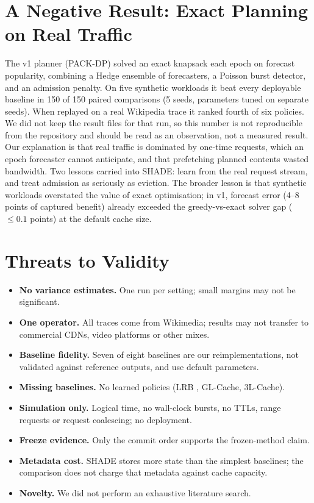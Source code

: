 \documentclass[conference]{IEEEtran}
\begin{document}
\section{A Negative Result: Exact Planning on Real Traffic}\label{sec:v1}
The v1 planner (PACK-DP) solved an exact knapsack each epoch on forecast popularity, combining a Hedge ensemble of
forecasters, a Poisson burst detector, and an admission penalty. On five synthetic workloads it beat every deployable
baseline in 150 of 150 paired comparisons (5 seeds, parameters tuned on separate seeds). When replayed on a real
Wikipedia trace it ranked fourth of six policies. We did not keep the result files for that run, so this number is
not reproducible from the repository and should be read as an observation, not a measured result. Our explanation
is that real traffic is dominated by one-time requests, which an epoch forecaster cannot anticipate, and that
prefetching planned contents wasted bandwidth. Two lessons carried into SHADE: learn from the real request stream,
and treat admission as seriously as eviction. The broader lesson is that synthetic workloads overstated the value of
exact optimisation; in v1, forecast error (4--8 points of captured benefit) already exceeded the greedy-vs-exact
solver gap ($\le0.1$ points) at the default cache size.

\section{Threats to Validity}
\begin{itemize}
\item \textbf{No variance estimates.} One run per setting; small margins may not be significant.
\item \textbf{One operator.} All traces come from Wikimedia; results may not transfer to commercial CDNs, video
platforms or other mixes.
\item \textbf{Baseline fidelity.} Seven of eight baselines are our reimplementations, not validated against
reference outputs, and use default parameters.
\item \textbf{Missing baselines.} No learned policies (LRB \cite{lrb}, GL-Cache, 3L-Cache).
\item \textbf{Simulation only.} Logical time, no wall-clock bursts, no TTLs, range requests or request coalescing;
no deployment.
\item \textbf{Freeze evidence.} Only the commit order supports the frozen-method claim.
\item \textbf{Metadata cost.} SHADE stores more state than the simplest baselines; the comparison does not charge
that metadata against cache capacity.
\item \textbf{Novelty.} We did not perform an exhaustive literature search.
\end{itemize}
\end{document}
